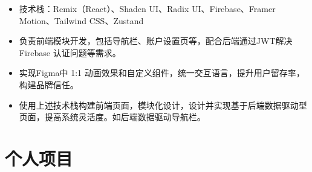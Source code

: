 \documentclass{resume}
\newcommand{\en}[1]{}
\newcommand{\zh}[1]{#1}
\begin{document}
\en{\datedsubsection{\textbf{\href{https://www.trychad.com/}{Chad}}}{}}
\zh{}
\en{\role{Front-End Engineer}{}}
\zh{}
\begin{itemize}
    \item \en{Tech stack: Remix (React), Shadcn UI, Radix UI, Firebase, Framer Motion, Tailwind CSS, Zustand}
          \zh{技术栈：Remix（React）、Shadcn UI、Radix UI、Firebase、Framer Motion、Tailwind CSS、Zustand}
    \item \en{Responsible for developing front-end modules, including navigation bar and account settings pages, and collaborating with the backend to address Firebase JWT authentication and related requirements.}
          \zh{负责前端模块开发，包括导航栏、账户设置页等，配合后端通过JWT解决 Firebase 认证问题等需求。}
    \item \en{Implemented pixel-perfect animations and custom components from Figma designs, unifying interaction language to improve user retention and build brand trust.}
          \zh{实现Figma中 1:1 动画效果和自定义组件，统一交互语言，提升用户留存率，构建品牌信任。}
    \item \en{Built modular frontend pages using the above tech stack, designing and implementing backend data-driven pages to increase system flexibility, such as a backend-driven navigation bar.}
          \zh{使用上述技术栈构建前端页面，模块化设计，设计并实现基于后端数据驱动型页面，提高系统灵活度。如后端数据驱动导航栏。}
\end{itemize}

\section{\en{Portfolios}\zh{个人项目}}
\end{document}
